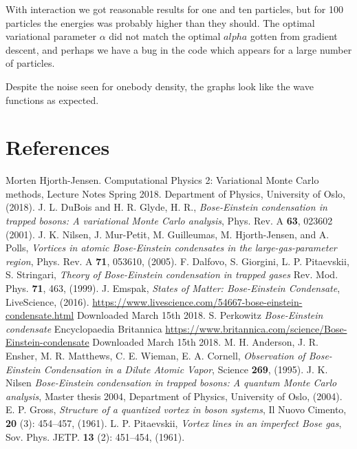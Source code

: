 \documentclass[norsk,a4paper,12pt]{article}
\begin{document}
With interaction we got reasonable results for one and ten particles, but for 100 particles the energies was probably higher than they should. The optimal variational parameter $\alpha$ did not match the optimal $alpha$ gotten from gradient descent, and perhaps we have a bug in the code which appears for a large number of particles. 

Despite the noise seen for onebody density, the graphs look like the wave functions as expected.




\newpage
\section{References}
\begingroup
\renewcommand{\section}[2]{}
\begin{thebibliography}{}
	Morten Hjorth-Jensen.
	Computational Physics 2: Variational Monte Carlo methods, Lecture Notes Spring 2018.
	Department of Physics, University of Oslo,
	(2018).
	J. L. DuBois and H. R. Glyde, H. R., \emph{Bose-Einstein condensation in trapped bosons: A variational Monte Carlo analysis}, Phys. Rev. A \textbf{63}, 023602 (2001).
	J. K. Nilsen,  J. Mur-Petit, M. Guilleumas, M. Hjorth-Jensen, and A. Polls, \emph{Vortices in atomic Bose-Einstein condensates in the large-gas-parameter region}, Phys. Rev. A \textbf{71}, 053610, (2005).
	F. Dalfovo, S. Giorgini, L. P. Pitaevskii, S. Stringari, \emph{Theory of Bose-Einstein condensation in trapped gases} Rev. Mod. Phys. \textbf{71}, 463, (1999).
	J. Emspak, \emph{States of Matter: Bose-Einstein Condensate}, LiveScience, (2016).
	\url{https://www.livescience.com/54667-bose-einstein-condensate.html}
	Downloaded March 15th 2018.
	S. Perkowitz \emph{Bose-Einstein condensate} Encyclopaedia Britannica 
	\url{https://www.britannica.com/science/Bose-Einstein-condensate}
	Downloaded March 15th 2018.
	    M. H. Anderson, J. R. Ensher, M. R. Matthews, C. E. Wieman, E. A. Cornell, \emph{Observation of Bose-Einstein Condensation in a Dilute Atomic Vapor}, Science \textbf{269}, (1995).
		J. K. Nilsen \emph{Bose-Einstein condensation in trapped bosons: A quantum Monte Carlo analysis}, Master thesis 2004, Department of Physics, University of Oslo, (2004). 
		E. P. Gross, \emph{Structure of a quantized vortex in boson systems}, Il Nuovo Cimento, \textbf{20} (3): 454–457, (1961).
		 L. P. Pitaevskii, \emph{Vortex lines in an imperfect Bose gas}, Sov. Phys. JETP. \textbf{13} (2): 451–454, (1961).

	
\end{thebibliography}
\endgroup
\end{document}
